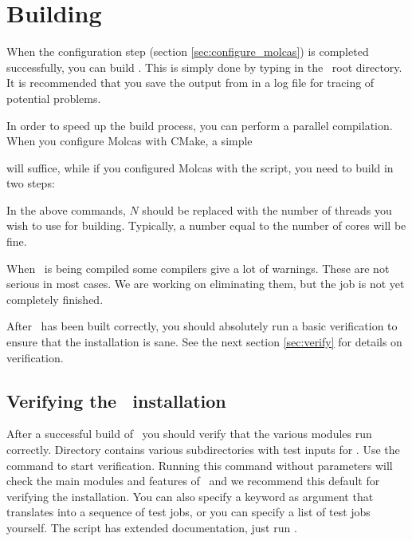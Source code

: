 \section{\label{sec:building_molcas}Building \molcas}

When the configuration step (section \ref{sec:configure_molcas}) is completed
successfully, you can build \molcas.
This is simply done by typing  in the \molcas\ root directory.
It is recommended that you save the output from  in a log file
for tracing of potential problems.
\begin{description}
\item {}
\end{description}

In order to speed up the build process, you can perform a parallel compilation.
When you configure Molcas with CMake, a simple
\begin{description}
\item {}
\end{description}
will suffice, while if you configured Molcas with the  script,
you need to build in two steps:
\begin{description}
\item {}
\item {}
\end{description}
In the above commands, $N$ should be replaced with the number of threads
you wish to use for building. Typically, a number equal to the number of cores
will be fine.

When \molcas\ is being compiled some compilers give a lot of warnings.
These are not serious in most cases. We are working on eliminating them, but
the job is not yet completely finished.

After \molcas\ has been built correctly, you should absolutely run a basic
verification to ensure that the installation is sane. See the next section
\ref{sec:verify} for details on verification.

\subsection{\label{sec:verify}Verifying the \molcas\ installation}

After a successful build of \molcas\ you should verify that the various
modules run correctly. Directory 
contains various subdirectories with test inputs for \molcas. Use the command
 to start verification.
Running this command without parameters will check
the main modules and features of \molcas\ and we recommend this default
for verifying the installation.
You can also specify a keyword as argument that translates into a
sequence of test jobs,
or you can specify a list of test jobs yourself.
The script has extended documentation, just run
.

